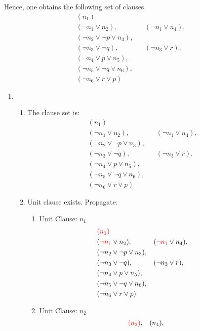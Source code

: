 \documentclass[11pt,a4paper]{article}
\begin{document}
Hence, one obtains the following set of clauses.
\begin{align*}
& (n_1) \\
& (\neg n_1 \lor n_2 ), &&  (\neg  n_1 \lor n_4), \\
& (\neg n_2 \lor \neg p \lor n_3), \\
& (\neg n_3 \lor \neg q) , &&  (\neg n_3 \lor r), \\
& (\neg n_4 \lor p \lor n_5), \\
& (\neg n_5 \lor \neg q \lor n_6), \\
& (\neg n_6 \lor r \lor p)
\end{align*}



\begin{enumerate}

\item 
\begin{enumerate}
\item The clause set is:
\begin{align*}
& (n_1) \\
& (\neg n_1 \lor n_2 ), &&  (\neg  n_1 \lor n_4), \\
& (\neg n_2 \lor \neg p \lor n_3), \\
& (\neg n_3 \lor \neg q) , &&  (\neg n_3 \lor r), \\
& (\neg n_4 \lor p \lor n_5), \\
& (\neg n_5 \lor \neg q \lor n_6), \\
& (\neg n_6 \lor r \lor p)
\end{align*}
\item Unit clause exists. Propagate:
\begin{enumerate}
\item Unit Clause:  $n_1$
\begin{align*}
& \textcolor{red}{(n_1)} \\
& (\textcolor{red}{\neg n_1} \lor n_2 ), &&  (\textcolor{red}{\neg  n_1} \lor n_4), \\
& (\neg n_2 \lor \neg p \lor n_3), \\
& (\neg n_3 \lor \neg q) , &&  (\neg n_3 \lor r), \\
& (\neg n_4 \lor p \lor n_5), \\
& (\neg n_5 \lor \neg q \lor n_6), \\
& (\neg n_6 \lor r \lor p)
\end{align*}
\item Unit Clause:  $n_2$
\begin{align*}
& \textcolor{red}{(n_2)}, &&  (n_4), \\

\end{align*}
\end{enumerate}
\end{enumerate}
\end{enumerate}
\end{document}
